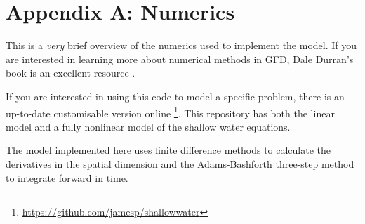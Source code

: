 \documentclass[a4paper, sfsidenotes, twoside]{tufte-handout}
\begin{document}
  \section{Appendix A: Numerics}
  \label{sec:appendixa}

  \noindent This is a \emph{very} brief overview of the numerics used to implement the model.
  If you are interested in learning more about numerical methods in GFD, Dale Durran's book is an excellent resource \cite{Durran:2010hy}.

  If you are interested in using this code to model a specific problem, there is an up-to-date customisable version online \footnote{\url{https://github.com/jamesp/shallowwater}}.
  This repository has both the linear model and a fully nonlinear model of the shallow water equations.

  \noindent The model implemented here uses finite difference methods to calculate the derivatives in the spatial dimension and the Adams-Bashforth three-step method to integrate forward in time.
\end{document}
